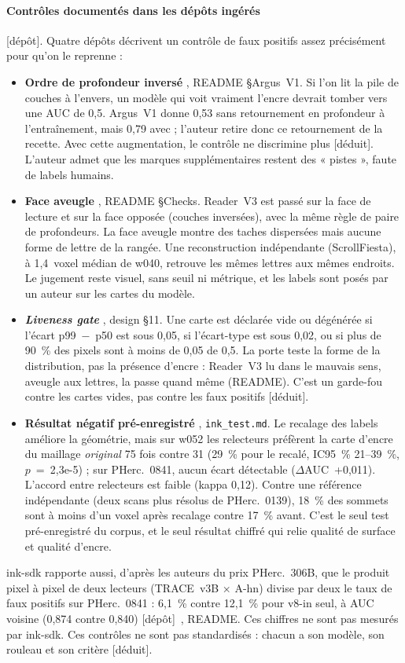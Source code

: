 \documentclass[11pt,a4paper]{article}
\newcommand{\deduit}{\textsf{\small[déduit]}}
\newcommand{\depot}{\textsf{\small[dépôt]}}
\newcommand{\pherc}[1]{PHerc.~#1}
\begin{document}
\paragraph{Contrôles documentés dans les dépôts ingérés} \depot. Quatre dépôts décrivent un
contrôle de faux positifs assez précisément pour qu'on le reprenne :
\begin{itemize}
  \item \textbf{Ordre de profondeur inversé} \cite{ruiconte2026}, README §Argus~V1. Si l'on
  lit la pile de couches à l'envers, un modèle qui voit vraiment l'encre devrait tomber vers
  une AUC de 0,5. Argus~V1 donne 0,53 sans retournement en profondeur à l'entraînement,
  mais 0,79 avec ; l'auteur retire donc ce retournement de la recette. Avec cette
  augmentation, le contrôle ne discrimine plus \deduit. L'auteur admet que les marques supplémentaires
  restent des « pistes », faute de labels humains.
  \item \textbf{Face aveugle} \cite{demeij2026}, README §Checks. Reader~V3 est passé sur la
  face de lecture et sur la face opposée (couches inversées), avec la même règle de paire de
  profondeurs. La face aveugle montre des taches dispersées mais aucune forme de lettre de la
  rangée. Une reconstruction indépendante (ScrollFiesta), à 1,4~voxel médian de w040,
  retrouve les mêmes lettres aux mêmes endroits. Le jugement reste visuel, sans seuil ni
  métrique, et les labels sont posés par un auteur sur les cartes du modèle.
  \item \textbf{\emph{Liveness gate}} \cite{limegs2026sdk}, design §11. Une carte est
  déclarée vide ou dégénérée si l'écart p99~$-$~p50 est sous 0,05, si l'écart-type est sous 0,02, ou si
  plus de 90~\% des pixels sont à moins de 0,05 de 0,5. La porte teste la forme de la
  distribution, pas la présence d'encre : Reader~V3 lu dans le mauvais sens, aveugle aux
  lettres, la passe quand même (README). C'est un garde-fou contre les cartes vides, pas
  contre les faux positifs \deduit.
  \item \textbf{Résultat négatif pré-enregistré} \cite{snyder2026}, \texttt{ink\_test.md}.
  Le recalage des labels améliore la géométrie, mais sur w052 les relecteurs préfèrent la
  carte d'encre du maillage \emph{original} 75 fois contre 31 (29~\% pour le recalé, IC95~\%
  21–39~\%, $p$~=~2,3e-5) ; sur \pherc{0841}, aucun écart détectable ($\Delta$AUC~+0,011).
  L'accord entre relecteurs est faible (kappa 0,12). Contre une référence indépendante (deux
  scans plus résolus de \pherc{0139}), 18~\% des sommets sont à moins d'un voxel après
  recalage contre 17~\% avant. C'est le seul test pré-enregistré du corpus, et le seul
  résultat chiffré qui relie qualité de surface et qualité d'encre.
\end{itemize}
ink-sdk rapporte aussi, d'après les auteurs du prix \pherc{306B}, que le produit pixel à
pixel de deux lecteurs (TRACE~v3B × A-hn) divise par deux le taux de faux positifs sur
\pherc{0841} : 6,1~\% contre 12,1~\% pour v8-in seul, à AUC voisine (0,874 contre 0,840)
\depot~\cite{limegs2026sdk}, README. Ces chiffres ne sont pas mesurés par ink-sdk.
Ces contrôles ne sont pas standardisés : chacun a son modèle, son rouleau et son critère
\deduit.
\end{document}
